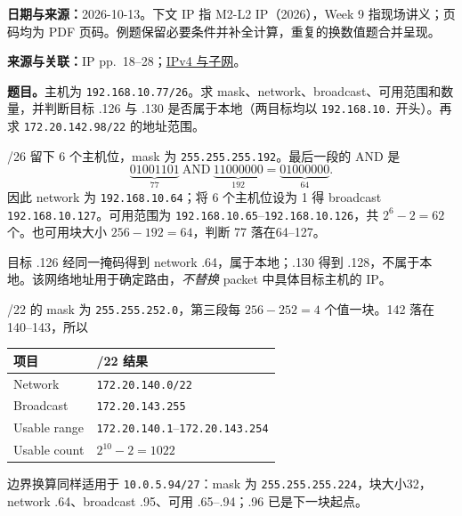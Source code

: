 \begingroup
\renewcommand{\recordid}[1]{}
\renewcommand{\relatedtopic}[2]{\hyperref[topic:#1]{#2}}


\textbf{日期与来源：}2026-10-13。下文 IP 指 M2-L2 IP（2026），Week 9 指现场讲义；页码均为 PDF 页码。例题保留必要条件并补全计算，重复的换数值题合并呈现。


\textbf{来源与关联：}IP pp.~18--28；\relatedtopic{SC2008-L06-T02}{IPv4 与子网}。

\textbf{题目。}主机为 \texttt{192.168.10.77/26}。求 mask、network、broadcast、可用范围和数量，并判断目标 .126 与 .130 是否属于本地（两目标均以 \texttt{192.168.10.} 开头）。再求 \texttt{172.20.142.98/22} 的地址范围。

\begin{workedsolution}
/26 留下 6 个主机位，mask 为 \texttt{255.255.255.192}。最后一段的 AND 是
\[
 \underbrace{01001101}_{77}\ \mathrm{AND}\
 \underbrace{11000000}_{192}=\underbrace{01000000}_{64}.
\]
因此 network 为 \texttt{192.168.10.64}；将 6 个主机位设为 1 得 broadcast \texttt{192.168.10.127}。可用范围为 \texttt{192.168.10.65}--\texttt{192.168.10.126}，共 $2^6-2=62$ 个。也可用块大小 $256-192=64$，判断 77 落在64--127。

目标 .126 经同一掩码得到 network .64，属于本地；.130 得到 .128，不属于本地。该网络地址用于确定路由，\emph{不替换} packet 中具体目标主机的 IP。

/22 的 mask 为 \texttt{255.255.252.0}，第三段每 $256-252=4$ 个值一块。142 落在140--143，所以
\begin{center}
\small
\begin{tabular}{@{}ll@{}}
\toprule
项目 & /22 结果 \\
\midrule
Network & \texttt{172.20.140.0/22} \\
Broadcast & \texttt{172.20.143.255} \\
Usable range & \texttt{172.20.140.1}--\texttt{172.20.143.254} \\
Usable count & $2^{10}-2=1022$ \\
\bottomrule
\end{tabular}
\end{center}
边界换算同样适用于 \texttt{10.0.5.94/27}：mask 为 \texttt{255.255.255.224}，块大小32，network .64、broadcast .95、可用 .65--.94；.96 已是下一块起点。
\end{workedsolution}

